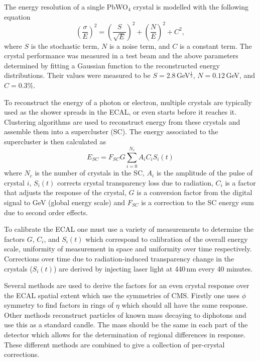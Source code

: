 The energy resolution of a single PbWO$_{4}$ crystal is modelled with the following equation \cite{CMSPhysics}
\begin{equation}
    \label{eq:apparatus:ecal_energy_reso}
        \left( \frac{\sigma}{E} \right)^{2} =  
        \left( \frac{S}{\sqrt{E}} \right)^{2} +  
        \left( \frac{N}{E} \right)^{2} +  
        C^{2},
\end{equation}
where $S$ is the stochastic term, $N$ is a noise term, and $C$ is a constant term. The crystal performance was measured in a test beam and the above parameters determined by fitting a Gaussian function to the reconstructed energy distributions. Their values were measured to be $S=2.8$\,GeV$^{\frac{1}{2}}$, $N=0.12$\,GeV, and $C=0.3$\%.

To reconstruct the energy of a photon or electron, multiple crystals are typically used as the shower spreads in the ECAL, or even starts before it reaches it. 
Clustering algorithms \cite{ecalShower} are used to reconstruct energy from these crystals and assemble them into a supercluster (SC). The energy associated to the supercluster is then calculated as
\begin{equation}
    E_{SC} = F_{SC}G\sum^{N_{c}}_{i=0}A_{i}C_{i}S_{i}(t)
\end{equation}
where $N_{c}$ is the number of crystals in the SC, $A_{i}$ is the amplitude of the pulse of crystal $i$, $S_{i}(t)$ corrects crystal transparency loss due to radiation, $C_{i}$ is a factor that adjusts the response of the crystal, $G$ is a conversion factor from the digital signal to GeV (global energy scale) and $F_{SC}$ is a correction to the SC energy sum due to second order effects.

To calibrate the ECAL \cite{cmsEcalCalibration} one must use a variety of measurements to determine the factors $G$, $C_{i}$, and $S_{i}(t)$ which correspond to calibration of the overall energy scale, uniformity of measurement in space and uniformity over time respectively. 
Corrections over time due to radiation-induced transparency change in the crystals ($S_{i}(t)$) are derived by injecting laser light at 440\,nm every 40 minutes. 

Several methods are used to derive the factors for an even crystal response over the ECAL spatial extent which use the symmetries of CMS. Firstly one uses $\phi$ symmetry to find factors in rings of $\eta$ which should all have the same response. 
Other methods reconstruct particles of known mass decaying to diphotons and use this as a standard candle. The mass should be the same in each part of the detector which allows for the determination of regional differences in response. These different methods are combined to give a collection of per-crystal corrections. 

